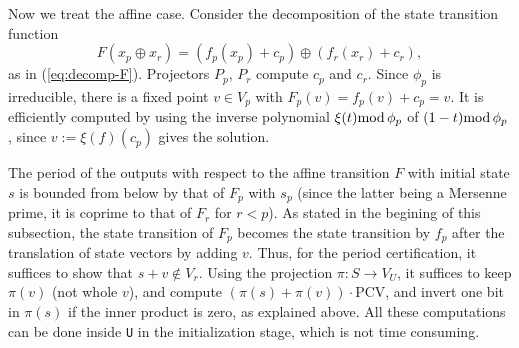 \documentclass{svmult}
\def\bbf2{\ifmmode \mathbb{F}_2 \else $\mathbb{F}_2$ \fi}
\begin{document}
Now we treat the affine case.
Consider the decomposition of the state transition function
$$
F(x_p\oplus x_r)=
(f_p(x_p)+c_p) \oplus (f_r(x_r)+c_r),
$$
as in (\ref{eq:decomp-F}).
Projectors $P_p$, $P_r$ compute $c_p$ and $c_r$.
Since $\phi_p$ is irreducible, there is a fixed point $v \in V_p$
with $F_p(v)=f_p(v)+c_p=v$. It is
efficiently computed by using the inverse polynomial
$\xi(t) \textrm{mod}\, \phi_p$ of $(1 - t) \textrm{mod}\, \phi_p$,
since $v:=\xi(f)(c_p)$ gives the solution.


The period of the outputs with respect to 
the affine transition $F$ with initial 
state $s$ is bounded from below
by that of $F_p$ with $s_p$ (since the latter being a Mersenne prime,
it is coprime to that of $F_r$ for $r<p$).
As stated in the begining of this subsection,
the state transition of $F_p$ becomes the state transition 
by $f_p$ after the translation of state vectors by adding $v$. 
Thus, for the period certification, it suffices to 
show that $s + v \notin V_r$. Using the projection 
$\pi: S \to V_U$, it suffices to keep $\pi(v)$ (not whole $v$),
and compute $(\pi(s) + \pi(v))\cdot \mathrm{PCV}$, 
and invert one bit in $\pi(s)$ if the inner product is zero, as 
explained above. All these computations can be done
inside \texttt{U} in the initialization stage, which
is not time consuming. 

\end{document}
